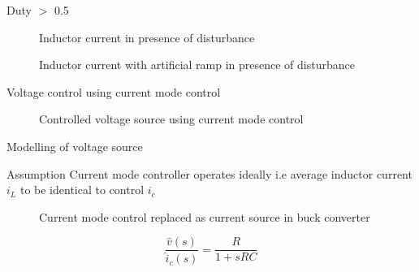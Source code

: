 \documentclass[10pt]{beamer}
\begin{document}
\begin{frame}{Duty $>$ 0.5}
 \vspace{-0.2cm}
  \begin{figure}
    \centering
    
    \vspace{-0.4cm}
    \caption{Inductor current in presence of disturbance}
    \label{fig:19}
  \end{figure}
  \vspace{-0.5cm}
  \begin{figure}
    \centering
    
    \vspace{-0.4cm}
    \caption{Inductor current with artificial ramp in presence of disturbance}
    \label{fig:22}
  \end{figure}

\end{frame}

\begin{frame}{Voltage control using current mode control}
  \begin{figure}
    \centering
    
    \caption{Controlled voltage source using current mode control}
    \label{fig:24}
  \end{figure}
\end{frame}

\begin{frame}{Modelling of voltage source}
\begin{block}{Assumption}
  Current mode controller operates ideally i.e average inductor current $i_L$ to be identical to control $i_c$
\end{block}
\begin{figure}
  \centering
  
  \caption{Current mode control replaced as current source in buck converter}
  \label{fig:25}
\end{figure}

  \begin{equation}
    \dfrac{\hat{v}(s)}{\hat{i}_c(s)} = \dfrac{R}{1+sRC}
  \end{equation}
\end{frame}
\end{document}
